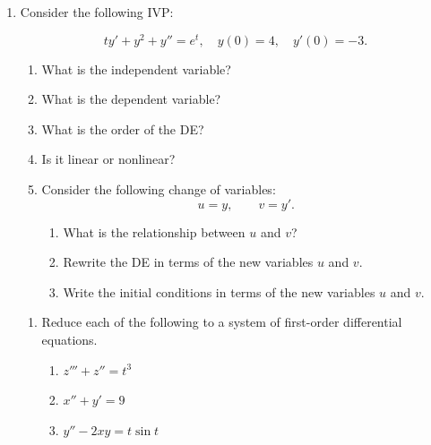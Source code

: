 \documentclass[12pt]{amsart}
\newcommand{\<}{\langle}
\renewcommand{\>}{\rangle}
\numberwithin{equation}{section}
\begin{document}
	\begin{enumerate}
		\item  Consider the following IVP:
		
		\[ 
			ty' + y^2 + y''= e^t,\quad y(0) = 4,\quad y'(0) = -3.
		\]
		\smallskip
		
		\begin{enumerate}

			\item What is the independent variable?
			\bigskip

			\item What is the dependent variable?
			\bigskip

			\item What is the order of the DE?
			\bigskip

			\item Is it linear or nonlinear?
			\bigskip
			
			\item Consider the following change of variables:
			\[
				u = y,\qquad v = y'.
			\]
			
			\begin{enumerate}
				\item What is the relationship between $u$ and $v$?
				\vfill
				
				\item Rewrite the DE in terms of the new variables $u$ and $v.$
				\vfill
				
				\item Write the initial conditions in terms of the new variables $u$ and $v.$
				\vfill
			\end{enumerate}

		\end{enumerate}

		\newpage

		\begin{enumerate}

			\item Reduce each of the following to a system of first-order differential equations.
			\bigskip

			\begin{enumerate}
				\item \(z''' + z'' = t^3\)
				\vfill
				
				\item \(x'' + y' = 9\)
				\vfill

				\item \(y'' - 2xy = t\sin t\)
				\vfill
			\end{enumerate}
			
		\end{enumerate}

	\end{enumerate}
\end{document}
